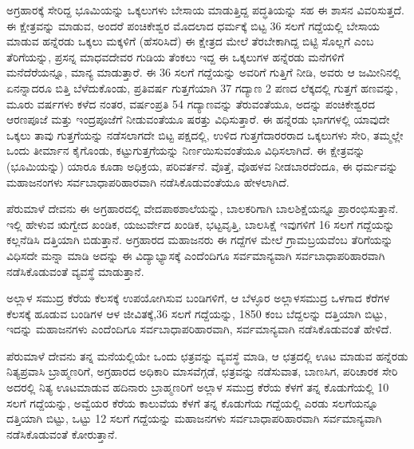 ಅಗ್ರಹಾರಕ್ಕೆ ಸೇರಿದ್ದ ಭೂಮಿಯನ್ನು ಒಕ್ಕಲುಗಳು ಬೇಸಾಯ ಮಾಡುತ್ತಿದ್ದ ಪದ್ಧತಿಯನ್ನು ಸಹ ಈ ಶಾಸನ ವಿವರಿಸುತ್ತದೆ. ಈ ಕ್ಷೇತ್ರವನ್ನು ಮಾಡುವ, ಅಂದರೆ ಪಂಚಿಕೇಶ್ವರ ಮೊದಲಾದ ಧರ್ಮಕ್ಕೆ ಬಿಟ್ಟ 36 ಸಲಗೆ ಗದ್ದೆಯಲ್ಲಿ ಬೇಸಾಯ ಮಾಡುವ ಹನ್ನೆರಡು ಒಕ್ಕಲು ಮಕ್ಕಳಿಗೆ (ಹೆಸರಿಸಿದೆ) ಈ ಕ್ಷೇತ್ರದ ಮೇಲೆ ತೆರಬೇಕಾಗಿದ್ದ ಬಿಟ್ಟಿ ಸೊಲ್ಲಗೆ ಎಂಬ ತೆರಿಗೆಯನ್ನು, ಪ್ರಸನ್ನ ಮಾಧವದೇವರ ಗುಡಿಯ ತೆಂಕಲು ಇದ್ದ ಈ ಒಕ್ಕಲುಗಳ ಹನ್ನೆರಡು ಮನೆಗಳಿಗೆ ಮನೆದೆರೆಯನ್ನೂ, ಮಾನ್ಯ ಮಾಡುತ್ತಾರೆ. ಈ 36 ಸಲಗೆ ಗದ್ದೆಯನ್ನು ಅವರಿಗೆ ಗುತ್ತಿಗೆ ನೀಡಿ, ಅವರು ಆ ಜಮೀನಿನಲ್ಲಿ ಏನನ್ನಾದರೂ ಬಿತ್ತಿ ಬೆಳೆದುಕೊಂಡು, ಪ್ರತಿವರ್ಷ ಗುತ್ತಗೆಯಾಗಿ 37 ಗದ್ಯಾಣ 2 ಪಣದ ಲೆಕ್ಕದಲ್ಲಿ ಗುತ್ತಗೆ ಹಣವನ್ನು, ಮೂರು ವರ್ಷಗಳು ಕಳೆದ ನಂತರ, ವರ್ಷಂಪ್ರತಿ 54 ಗದ್ಯಾಣವನ್ನು ತೆರುವಂತೆಯೂ, ಅದನ್ನು ಪಂಚಿಕೇಶ್ವರದ ಆರಣಪೂಜೆ ಮತ್ತು ಇಂದ್ರಪೂಜೆಗೆ ನೀಡುವಂತೆಯೂ ಷರತ್ತು ವಿಧಿಸುತ್ತಾರೆ. ಈ ಹನ್ನೆರಡು ಭಾಗಗಳಲ್ಲಿ ಯಾವುದೇ ಒಕ್ಕಲು ತಾವು ಗುತ್ತಗೆಯನ್ನು ನಡೆಸಲಾಗದೇ ಬಿಟ್ಟ ಪಕ್ಷದಲ್ಲಿ, ಉಳಿದ ಗುತ್ತಗೆದಾರರರಾದ ಒಕ್ಕಲುಗಳು ಸೇರಿ, ತಮ್ಮಲ್ಲೇ ಒಂದು ತೀರ್ಮಾನ ಕೈಗೊಂಡು, ಕಟ್ಟುಗುತ್ತಗೆಯನ್ನು ನಿರ್ಣಯಿಸುವಂತೆಯೂ ವಿಧಿಸಲಾಗಿದೆ. ಈ ಕ್ಷೇತ್ರವನ್ನು (ಭೂಮಿಯನ್ನು) ಯಾರೂ ಕೂಡಾ ಅಧಿಕ್ರಯ, ಪರಿವರ್ತನೆ. ವೊತ್ತೆ, ವೊಹಳವ ನೀಡಬಾರದೆಂದೂ, ಈ ಧರ್ಮವನ್ನು ಮಹಾಜನಂಗಳು ಸರ್ವಬಾಧಾಪರಿಹಾರವಾಗಿ ನಡೆಸಿಕೊಡುವಂತೆಯೂ ಹೇಳಲಾಗಿದೆ.

ಪೆರುಮಾಳೆ ದೇವನು ಈ ಅಗ್ರಹಾರದಲ್ಲಿ ವೇದಪಾಠಶಾಲೆಯನ್ನು, ಬಾಲಕರಿಗಾಗಿ ಬಾಲಶಿಕ್ಷೆಯನ್ನೂ ಪ್ರಾರಂಭಿಸು\-ತ್ತಾನೆ. ಇಲ್ಲಿ ಹೇಳುವ ಋಗ್ವೇದ ಖಂಡಿಕ, ಯಜುರ್ವೇದ ಖಂಡಿಕ, ಭಟ್ಟವೃತ್ತಿ, ಬಾಲಸಿಕ್ಷೆ ಇವುಗಳಿಗೆ 16 ಸಲಗೆ ಗದ್ದೆಯನ್ನು ಕಲ್ಲನೆಡಿಸಿ ದತ್ತಿಯಾಗಿ ಬಿಡುತ್ತಾನೆ. ಅಗ್ರಹಾರದ ಮಹಾಜನರು ಈ ಗದ್ದೆಗಳ ಮೇಲೆ ಗ್ರಾಮಬ್ರಯವೆಂಬ ತೆರಿಗೆಯನ್ನು ವಿಧಿಸದೇ ಮನ್ನಾ ಮಾಡಿ ಅದನ್ನು ಈ ವಿದ್ಯಾಭ್ಯಾಸಕ್ಕೆ ಎಂದೆಂದಿಗೂ ಸರ್ವಮಾನ್ಯವಾಗಿ ಸರ್ವಬಾಧಾಪರಿಹಾರವಾಗಿ ನಡೆಸಿಕೊಡುವಂತೆ ವ್ಯವಸ್ಥೆ ಮಾಡುತ್ತಾನೆ.

ಅಲ್ಲಾಳ ಸಮುದ್ರ ಕೆರೆಯ ಕೆಲಸಕ್ಕೆ ಉಪಯೋಗಿಸುವ ಬಂಡಿಗಳಿಗೆ, ಆ ಬೆಳ್ಳೂರ ಅಲ್ಲಾಳಸಮುದ್ರ ಒಳಗಾದ ಕೆರೆಗಳ ಕೆಲಸಕ್ಕೆ ಹೂಡುವ ಬಂಡಿಗಳ ಆಳ ಜೀವಿತಕ್ಕೆ,36 ಸಲಗೆ ಗದ್ದೆಯನ್ನು, 1850 ಕಂಬ ಬೆದ್ದಲನ್ನು ದತ್ತಿಯಾಗಿ ಬಿಟ್ಟು, ಇದನ್ನು ಮಹಾಜನಗಳು ಎಂದೆಂದಿಗೂ ಸರ್ವಬಾಧಾಪರಿಹಾರವಾಗಿ, ಸರ್ವಮಾನ್ಯವಾಗಿ ನಡೆಸಿಕೊಡುವಂತೆ ಹೇಳಿದೆ.

ಪೆರುಮಾಳೆ ದೇವನು ತನ್ನ ಮನೆಯಲ್ಲಿಯೇ ಒಂದು ಛತ್ರವನ್ನು ವ್ಯವಸ್ಥೆ ಮಾಡಿ, ಆ ಛತ್ರದಲ್ಲಿ ಊಟ ಮಾಡುವ ಹನ್ನೆರಡು ನಿತ್ಯಪ್ರವಾಸಿ ಬ್ರಾಹ್ಮಣರಿಗೆ, ಅಗ್ರಹಾರದ ಅಧಿಕಾರಿ ಮಾಸವೆಗ್ಗಡೆ, ಛತ್ರವನ್ನು ನಡೆಸುವಾತ, ಬಾಣಸಿಗ, ಪರಿಚಾರಕ ಸೇರಿ ಅದರಲ್ಲಿ ನಿತ್ಯ ಊಟಮಾಡುವ ಹದಿನಾರು ಬ್ರಾಹ್ಮಣರಿಗೆ ಅಲ್ಲಾಳ ಸಮುದ್ರ ಕೆರೆಯ ಕೆಳಗೆ ತನ್ನ ಕೊಡುಗೆಯಲ್ಲಿ 10 ಸಲಗೆ ಗದ್ದೆಯನ್ನು, ಅವ್ವೆಯರ ಕೆರೆಯ ಕಾಲುವೆಯ ಕೆಳಗೆ ತನ್ನ ಕೊಡುಗೆಯ ಗದ್ದೆಯಲ್ಲಿ ಎರಡು ಸಲಗೆಯನ್ನೂ ದತ್ತಿಯಾಗಿ ಬಿಟ್ಟು, ಒಟ್ಟು 12 ಸಲಗೆ ಗದ್ದೆಯನ್ನು ಮಹಾಜನಗಳು ಸರ್ವಬಾಧಾಪರಿಹಾರವಾಗಿ ಸರ್ವಮಾನ್ಯವಾಗಿ ನಡೆಸಿಕೊಡುವಂತೆ ಕೋರುತ್ತಾನೆ.

